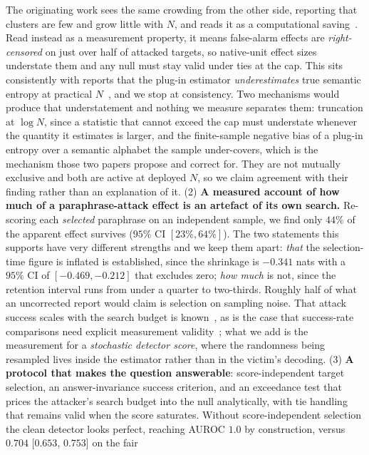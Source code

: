 The originating work sees the same crowding from the other side, reporting
that clusters are few and grow little with $N$, and reads it as a computational
saving~\citep{kuhn2023semantic, farquhar2024detecting}. Read instead as a measurement
property, it means false-alarm effects are \emph{right-censored} on just over half of attacked
targets, so native-unit effect sizes understate them and any null must stay valid under ties
at the cap. This sits consistently with reports that the plug-in estimator
\emph{underestimates} true semantic entropy at practical
$N$~\citep{mccabe2025alphabet, pan2026shade}, and we stop at consistency. Two mechanisms
would produce that understatement and nothing we measure separates them: truncation at
$\log N$, since a statistic that cannot exceed the cap must understate whenever the quantity
it estimates is larger, and the finite-sample negative bias of a plug-in entropy over a
semantic alphabet the sample under-covers, which is the mechanism those two papers propose
and correct for. They are not mutually exclusive and both are active at deployed $N$, so we
claim agreement with their finding rather than an explanation of it.
(2) \textbf{A measured account of how much of a paraphrase-attack effect is an artefact of
its own search.} Re-scoring each \emph{selected} paraphrase on an independent sample, we
find only $44\%$ of the apparent effect survives ($95\%$ CI $[23\%, 64\%]$). The two
statements this supports have very different strengths and we keep them apart: \emph{that}
the selection-time figure is inflated is established, since the shrinkage is $-0.341$ nats
with a $95\%$ CI of $[-0.469, -0.212]$ that excludes zero; \emph{how much} is not, since the
retention interval runs from under a quarter to two-thirds. Roughly half of what an
uncorrected report would claim is selection on sampling noise. That attack success scales
with the search budget is known~\citep{hughes2024bon}, as is the case that success-rate
comparisons need explicit measurement validity~\citep{chouldechova2025comparison}; what we
add is the measurement for a \emph{stochastic detector score}, where the randomness being
resampled lives inside the estimator rather than in the victim's decoding.
(3) \textbf{A protocol that makes the question answerable}: score-independent target
selection, an answer-invariance success criterion, and an exceedance test that prices the
attacker's search budget into the null analytically, with tie handling that remains valid
when the score saturates. Without score-independent selection the clean detector looks
perfect, reaching AUROC $1.0$ by construction, versus $0.704$ [$0.653$, $0.753$] on the fair
